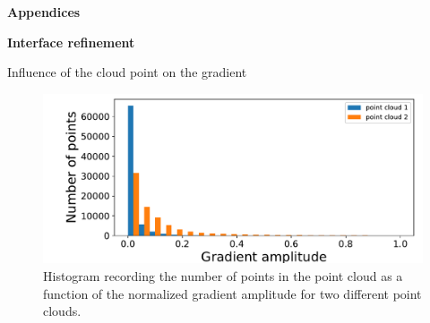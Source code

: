 \begin{frame}[noframenumbering]

\Large{\textbf{Appendices}}

\end{frame}


\begin{frame}[noframenumbering]

\Large{\textbf{Interface refinement}}

\end{frame}


\begin{frame}[noframenumbering]{Influence of the cloud point on the gradient}
\begin{figure}[H]
\centering
\includegraphics[scale=0.5]{image/histo_comparison_grad.pdf}
\caption{Histogram recording the number of points in the
point cloud as a function of the normalized gradient amplitude for two different point clouds.}
\label{histo_comparison_grad}
\end{figure}
\end{frame}



